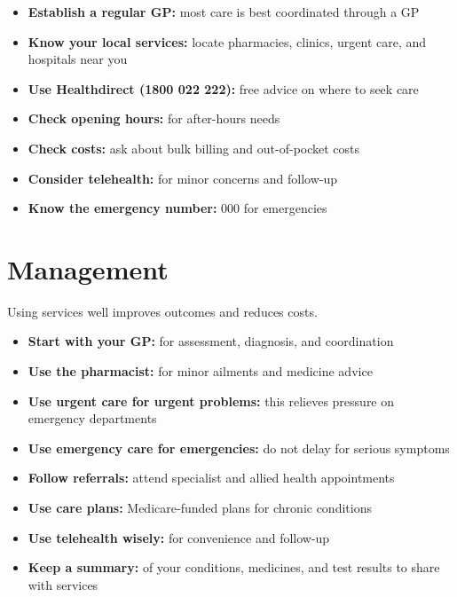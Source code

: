 \begin{itemize}
    \item \textbf{Establish a regular GP:} most care is best coordinated through a GP
    \item \textbf{Know your local services:} locate pharmacies, clinics, urgent care, and hospitals near you
    \item \textbf{Use Healthdirect (1800 022 222):} free advice on where to seek care
    \item \textbf{Check opening hours:} for after-hours needs
    \item \textbf{Check costs:} ask about bulk billing and out-of-pocket costs
    \item \textbf{Consider telehealth:} for minor concerns and follow-up
    \item \textbf{Know the emergency number:} 000 for emergencies
\end{itemize}

\section*{Management}
Using services well improves outcomes and reduces costs.

\begin{itemize}
    \item \textbf{Start with your GP:} for assessment, diagnosis, and coordination
    \item \textbf{Use the pharmacist:} for minor ailments and medicine advice
    \item \textbf{Use urgent care for urgent problems:} this relieves pressure on emergency departments
    \item \textbf{Use emergency care for emergencies:} do not delay for serious symptoms
    \item \textbf{Follow referrals:} attend specialist and allied health appointments
    \item \textbf{Use care plans:} Medicare-funded plans for chronic conditions
    \item \textbf{Use telehealth wisely:} for convenience and follow-up
    \item \textbf{Keep a summary:} of your conditions, medicines, and test results to share with services
\end{itemize}


